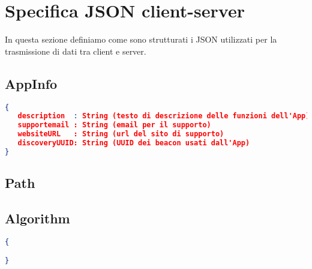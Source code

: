 \section{Specifica JSON client-server}
\label{sec:Specifica JSON client-server}

In questa sezione definiamo come sono strutturati i JSON utilizzati per la trasmissione di dati tra client e server.

\subsection{AppInfo}
\label{sub:AppInfo}
\begin{lstlisting}[language=json,firstnumber=1]
{
   description  : String (testo di descrizione delle funzioni dell'App)
   supportemail : String (email per il supporto)
   websiteURL   : String (url del sito di supporto)
   discoveryUUID: String (UUID dei beacon usati dall'App)
}
\end{lstlisting}



\subsection{Path}
\label{sub:Path}


\subsection{Algorithm}
\label{sub:Algorithm}
\begin{lstlisting}[language=json,firstnumber=1]
{

}
\end{lstlisting}
